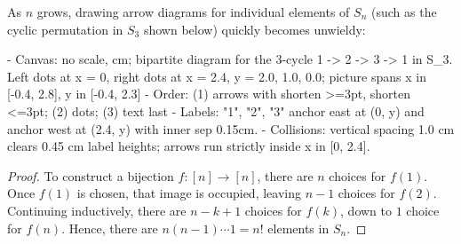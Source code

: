 \begin{content}
As $n$ grows, drawing arrow diagrams for individual elements of $S_n$ (such as the cyclic permutation in $S_3$ shown below) quickly becomes unwieldy:
\begin{hidden}
- Canvas: no scale, cm; bipartite diagram for the 3-cycle 1 -> 2 -> 3 -> 1 in S_3.
  Left dots at x = 0, right dots at x = 2.4, y = 2.0, 1.0, 0.0; picture spans x in [-0.4, 2.8], y in [-0.4, 2.3]
- Order: (1) arrows with shorten >=3pt, shorten <=3pt; (2) dots; (3) text last
- Labels: "1", "2", "3" anchor east at (0, y) and anchor west at (2.4, y) with inner sep 0.15cm.
- Collisions: vertical spacing 1.0 cm clears 0.45 cm label heights; arrows run strictly inside x in [0, 2.4].
\end{hidden}
\begin{center}
\end{center}


\begin{proof}
To construct a bijection $f \colon [n] \to [n]$, there are $n$ choices for $f(1)$. Once $f(1)$ is chosen, that image is occupied, leaving $n - 1$ choices for $f(2)$. Continuing inductively, there are $n - k + 1$ choices for $f(k)$, down to $1$ choice for $f(n)$. Hence, there are $n(n-1)\cdots 1 = n!$ elements in $S_n$.
\end{proof}
\end{content}

